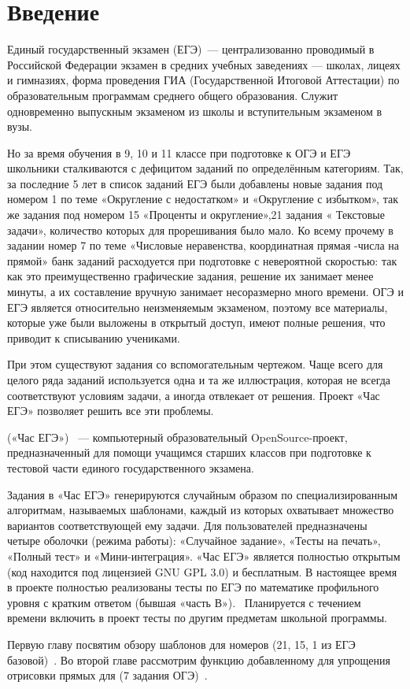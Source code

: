
\section*{Введение}
Единый государственный экзамен (ЕГЭ)~— централизованно проводимый в Российской
Федерации экзамен в средних учебных заведениях — школах, лицеях и гимназиях,
форма проведения ГИА (Государственной Итоговой Аттестации) по образовательным программам среднего общего образования.
Служит одновременно выпускным экзаменом из школы и вступительным экзаменом в вузы.

Но за время обучения в 9, 10 и 11 классе при подготовке к ОГЭ и ЕГЭ школьники сталкиваются с дефицитом заданий по определённым категориям.
Так, за последние 5 лет в список заданий ЕГЭ были добавлены новые задания под номером 1 по теме «Округление с недостатком» и «Округление с избытком», так же задания под номером 15 «Проценты и округление»,21 задания « Текстовые задачи», количество которых для прорешивания было мало. 
Ко всему прочему в задании номер 7 по теме «Числовые неравенства, координатная прямая -числа на прямой» банк заданий расходуется при подготовке с невероятной скоростью:
так как это преимущественно графические задания, решение их занимает менее минуты, а их составление вручную занимает несоразмерно много времени. ОГЭ и ЕГЭ является относительно неизменяемым экзаменом, поэтому все материалы, которые уже были выложены в открытый доступ, имеют полные решения, что приводит к списыванию учениками.

При этом существуют задания со вспомогательным чертежом. Чаще всего для целого ряда заданий используется одна и та же иллюстрация, которая не всегда соответствуют условиям задачи, а иногда отвлекает от решения.
Проект «Час ЕГЭ» позволяет решить все эти проблемы.

(«Час ЕГЭ»)~\cite{chas-ege} — компьютерный образовательный OpenSource-проект, предназначенный для помощи учащимся
старших классов при подготовке к тестовой части единого государственного экзамена.

Задания в «Час ЕГЭ» генерируются случайным образом по специализированным алгоритмам,
называемых шаблонами, каждый из которых
охватывает множество вариантов соответствующей ему задачи. Для
пользователей
предназначены четыре оболочки (режима работы): «Случайное задание», «Тесты на печать»,
«Полный тест» и «Мини-интеграция».
«Час ЕГЭ» является полностью открытым (код находится под лицензией GNU GPL 3.0)
и бесплатным.
В настоящее время в проекте полностью реализованы тесты по ЕГЭ по математике профильного уровня с кратким
ответом (бывшая «часть В»).~\cite{fipi}
Планируется с течением времени включить в проект тесты по другим предметам школьной
программы.

Первую главу посвятим обзору шаблонов для номеров (21, 15, 1 из ЕГЭ базовой)~\cite{egemath}.
Во второй главе рассмотрим функцию добавленному для упрощения отрисовки прямых для (7 задания ОГЭ)~\cite{ogemath}.
